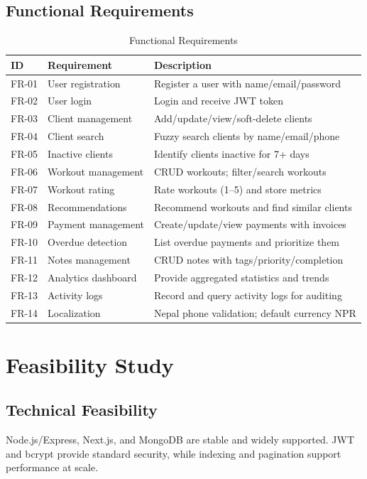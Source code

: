 \documentclass[12pt,a4paper]{report}
\begin{document}
\subsection{Functional Requirements}
\begin{table}[h]
\centering
\caption{Functional Requirements}
\begin{tabular}{@{}p{1.5cm}p{4.0cm}p{8.0cm}@{}}
\toprule
\textbf{ID} & \textbf{Requirement} & \textbf{Description} \\
\midrule
FR-01 & User registration & Register a user with name/email/password \\
FR-02 & User login & Login and receive JWT token \\
FR-03 & Client management & Add/update/view/soft-delete clients \\
FR-04 & Client search & Fuzzy search clients by name/email/phone \\
FR-05 & Inactive clients & Identify clients inactive for 7+ days \\
FR-06 & Workout management & CRUD workouts; filter/search workouts \\
FR-07 & Workout rating & Rate workouts (1--5) and store metrics \\
FR-08 & Recommendations & Recommend workouts and find similar clients \\
FR-09 & Payment management & Create/update/view payments with invoices \\
FR-10 & Overdue detection & List overdue payments and prioritize them \\
FR-11 & Notes management & CRUD notes with tags/priority/completion \\
FR-12 & Analytics dashboard & Provide aggregated statistics and trends \\
FR-13 & Activity logs & Record and query activity logs for auditing \\
FR-14 & Localization & Nepal phone validation; default currency NPR \\
\bottomrule
\end{tabular}
\end{table}

\section{Feasibility Study}
\subsection{Technical Feasibility}
Node.js/Express, Next.js, and MongoDB are stable and widely supported. JWT and bcrypt provide standard security, while indexing and pagination support performance at scale.
\end{document}
